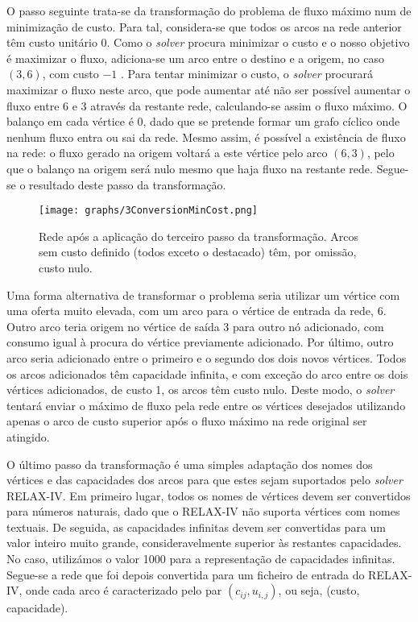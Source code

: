 \documentclass[12pt, a4paper, titlepage]{article}
\begin{document}
O passo seguinte trata-se da transformação do problema de fluxo máximo num de minimização de custo.
Para tal, considera-se que todos os arcos na rede anterior têm custo unitário 0. Como o
\emph{solver} procura minimizar o custo e o nosso objetivo é maximizar o fluxo, adiciona-se um arco
entre o destino e a origem, no caso $(3, 6)$, com custo $-1$ \cite{book}. Para tentar minimizar o
custo, o \emph{solver} procurará maximizar o fluxo neste arco, que pode aumentar até não ser
possível aumentar o fluxo entre 6 e 3 através da restante rede, calculando-se assim o fluxo máximo.
O balanço em cada vértice é 0, dado que se pretende formar um grafo cíclico onde nenhum fluxo entra
ou sai da rede. Mesmo assim, é possível a existência de fluxo na rede: o fluxo gerado na origem
voltará a este vértice pelo arco $(6, 3)$, pelo que o balanço na origem será nulo mesmo que haja
fluxo na restante rede. Segue-se o resultado deste passo da transformação.

\begin{figure}[H]
    \centering
    \texttt{[image: graphs/3ConversionMinCost.png]}
    \caption{\onehalfspacing
        Rede após a aplicação do terceiro passo da transformação. Arcos sem custo definido (todos
        exceto o destacado) têm, por omissão, custo nulo.}
    \label{3conversion-graph}
\end{figure}

Uma forma alternativa de transformar o problema seria utilizar um vértice com uma oferta muito
elevada, com um arco para o vértice de entrada da rede, 6. Outro arco teria origem no vértice de
saída 3 para outro nó adicionado, com consumo igual à procura do vértice previamente adicionado.
Por último, outro arco seria adicionado entre o primeiro e o segundo dos dois novos vértices. Todos
os arcos adicionados têm capacidade infinita, e com exceção do arco entre os dois vértices
adicionados, de custo 1, os arcos têm custo nulo. Deste modo, o \emph{solver} tentará enviar o
máximo de fluxo pela rede entre os vértices desejados utilizando apenas o arco de custo superior
após o fluxo máximo na rede original ser atingido.

O último passo da transformação é uma simples adaptação dos nomes dos vértices e das capacidades dos
arcos para que estes sejam suportados pelo \emph{solver} RELAX-IV. Em primeiro lugar, todos os nomes
de vértices devem ser convertidos para números naturais, dado que o \mbox{RELAX-IV} não suporta
vértices com nomes textuais. De seguida, as capacidades infinitas devem ser convertidas para um
valor inteiro muito grande, consideravelmente superior às restantes capacidades. No caso, utilizámos
o valor 1000 para a representação de capacidades infinitas. Segue-se a rede que foi depois
convertida para um ficheiro de entrada do RELAX-IV, onde cada arco é caracterizado pelo par
$(c_{i j}, u_{i, j})$, ou seja, (custo, capacidade).
\end{document}
